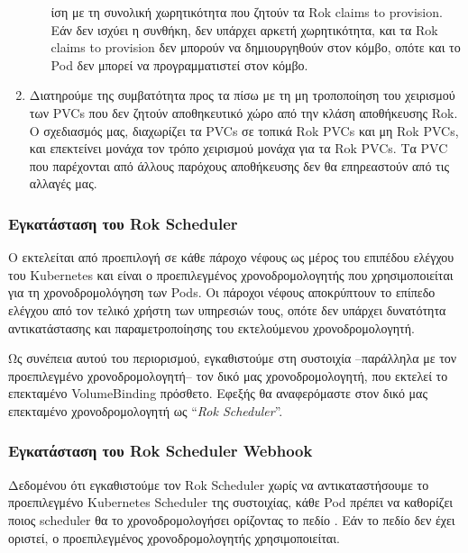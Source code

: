 \begin{enumerate}
\begin{enumerate}
                        ίση με τη συνολική χωρητικότητα που ζητούν τα Rok claims
                        to provision. Εάν δεν ισχύει η συνθήκη, δεν υπάρχει
                        αρκετή χωρητικότητα, και τα Rok claims to provision δεν
                        μπορούν να δημιουργηθούν στον κόμβο,  οπότε και το Pod
                        δεν μπορεί να προγραμματιστεί στον κόμβο.
            \end{enumerate}
      \item Διατηρούμε της συμβατότητα προς τα πίσω με τη μη τροποποίηση του
            χειρισμού των  PVCs που δεν ζητούν αποθηκευτικό χώρο από την κλάση
            αποθήκευσης Rok. Ο σχεδιασμός μας, διαχωρίζει τα PVCs σε τοπικά Rok
            PVCs και μη Rok PVCs, και επεκτείνει μονάχα τον τρόπο χειρισμού
            μονάχα για τα Rok PVCs. Τα PVC που παρέχονται από άλλους παρόχους
            αποθήκευσης δεν θα επηρεαστούν από τις αλλαγές μας.
\end{enumerate}



\subsubsection{Εγκατάσταση του Rok Scheduler}

Ο  εκτελείται από προεπιλογή σε κάθε πάροχο νέφους ως μέρος
του επιπέδου ελέγχου του Kubernetes και είναι ο προεπιλεγμένος χρονοδρομολογητής
που χρησιμοποιείται για τη χρονοδρομολόγηση των Pods. Οι πάροχοι νέφους
αποκρύπτουν το επίπεδο ελέγχου από τον τελικό χρήστη των υπηρεσιών τους, οπότε
δεν υπάρχει δυνατότητα αντικατάστασης και παραμετροποίησης του εκτελούμενου
χρονοδρομολογητή.

Ως συνέπεια αυτού του περιορισμού, εγκαθιστούμε στη συστοιχία --παράλληλα με τον
προεπιλεγμένο χρονοδρομολογητή--  τον δικό μας χρονοδρομολογητή, που εκτελεί το
επεκταμένο  VolumeBinding πρόσθετο.  Εφεξής θα αναφερόμαστε στον δικό μας
επεκταμένο χρονοδρομολογητή ως ``\textit{Rok Scheduler}''.

\subsubsection{Εγκατάσταση του Rok Scheduler Webhook}

Δεδομένου ότι εγκαθιστούμε τον Rok Scheduler χωρίς να αντικαταστήσουμε το
προεπιλεγμένο Kubernetes Scheduler της συστοιχίας, κάθε Pod πρέπει να καθορίζει
ποιος scheduler θα το χρονοδρομολογήσει ορίζοντας το πεδίο
. Εάν το πεδίο δεν έχει οριστεί, ο προεπιλεγμένος
χρονοδρομολογητής χρησιμοποιείται.

